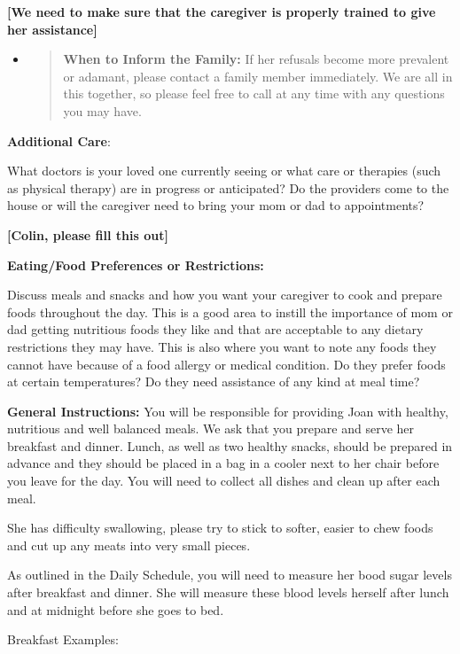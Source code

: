 \documentclass[]{article}
\begin{document}
\textbf{{[}We need to make sure that the caregiver is properly trained
to give her assistance{]}}

\begin{itemize}
\item
  \begin{quote}
  \textbf{When to Inform the Family:} If her refusals become more
  prevalent or adamant, please contact a family member immediately. We
  are all in this together, so please feel free to call at any time with
  any questions you may have.
  \end{quote}
\end{itemize}

\textbf{Additional Care}:

What doctors is your loved one currently seeing or what care or
therapies (such as physical therapy) are in progress or anticipated? Do
the providers come to the house or will the caregiver need to bring your
mom or dad to appointments?

\textbf{{[}Colin, please fill this out{]}}

\textbf{Eating/Food Preferences or Restrictions:}

Discuss meals and snacks and how you want your caregiver to cook and
prepare foods throughout the day. This is a good area to instill the
importance of mom or dad getting nutritious foods they like and that are
acceptable to any dietary restrictions they may have. This is also where
you want to note any foods they cannot have because of a food allergy or
medical condition. Do they prefer foods at certain temperatures? Do they
need assistance of any kind at meal time?

\textbf{General Instructions:} You will be responsible for providing
Joan with healthy, nutritious and well balanced meals. We ask that you
prepare and serve her breakfast and dinner. Lunch, as well as two
healthy snacks, should be prepared in advance and they should be placed
in a bag in a cooler next to her chair before you leave for the day. You
will need to collect all dishes and clean up after each meal.

She has difficulty swallowing, please try to stick to softer, easier to
chew foods and cut up any meats into very small pieces.

As outlined in the Daily Schedule, you will need to measure her bood
sugar levels after breakfast and dinner. She will measure these blood
levels herself after lunch and at midnight before she goes to bed.

Breakfast Examples:
\end{document}
